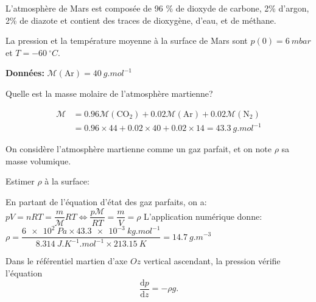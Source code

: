 L'atmosphère de Mars est composée de 96 \% de dioxyde de carbone,
2\% d'argon, 2\% de diazote et contient des traces de dioxygène, d'eau,
et de méthane.

La pression et la température moyenne à la surface de Mars sont $p(0)=\SI{6}{mbar}$
et $T=\SI{-60}{{^\circ}C}$. 

\textbf{Données:} $\mathcal{M}\left(\text{Ar}\right)=\SI{40}{g.mol^{-1}}$

\debutEntrainement


\begin{enonce}
Quelle est la masse molaire de l'atmosphère martienne?
\end{enonce}
%
\begin{corrige}

\begin{align*}
\mathcal{M} & =\num{0.96}\mathcal{M}\left(\text{CO}_{2}\right)+\num{0.02}\mathcal{M}\left(\text{Ar}\right)+\num{0.02}\mathcal{M}\left(\text{N}_{2}\right)\\
 & =\num{0.96}\times44+\num{0.02}\times40+\num{0.02}\times14=\SI{43.3}{g.mol^{-1}}
\end{align*}

\end{corrige}

On considère l'atmosphère martienne comme un gaz parfait, et on note $\rho$  sa masse volumique.

\begin{enonce}
Estimer $\rho$ à la surface:
\end{enonce}
\begin{corrige}
En partant de l'équation d'état des gaz parfaits, on a: $pV=nRT=\dfrac{m}{\mathcal{M}}RT\Leftrightarrow\dfrac{p\mathcal{M}}{RT}=\dfrac{m}{V}=\rho$
L'application numérique donne: $\rho=\dfrac{\SI{6e2}{Pa}\times\SI{43.3e-3}{kg.mol^{-1}}}{\SI{8.314}{J.K^{-1}.mol^{-1}}\times\SI{213.15}{K}}=\SI{14.7}{g.m^{-3}}$ 
\end{corrige}



Dans le référentiel martien d'axe $Oz$ vertical ascendant, la pression vérifie l'équation 
\[
\dfrac{\mathrm{d}p}{\mathrm{d}z}=-\rho g.
\]

